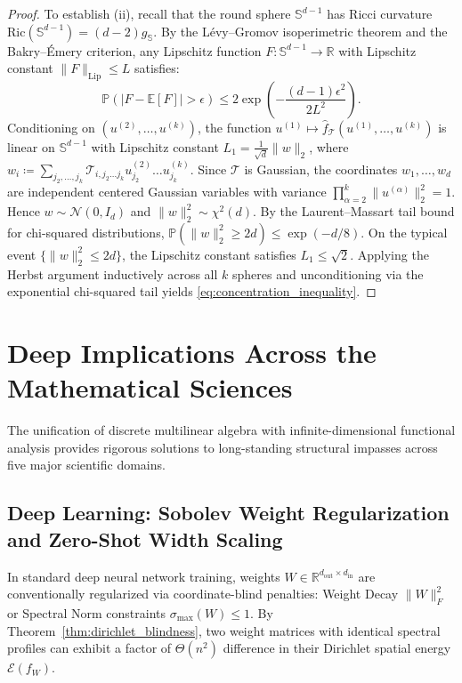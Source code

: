 \documentclass[11pt,a4paper,reqno]{amsart}
\theoremstyle{definition}
\numberwithin{equation}{section}
\providecommand{\R}{\mathbb{R}}
\providecommand{\Sph}{\mathbb{S}}
\newcommand{\Lip}{\operatorname{Lip}}
\providecommand{\Sph}{\mathbb{S}}
\providecommand{\R}{\mathbb{R}}
\begin{document}
\begin{proof}
To establish (ii), recall that the round sphere $\Sph^{d-1}$ has Ricci curvature $\mathrm{Ric}(\Sph^{d-1}) = (d-2) g_{\Sph}$. By the L\'evy--Gromov isoperimetric theorem and the Bakry--\'Emery criterion, any Lipschitz function $F \colon \Sph^{d-1} \to \R$ with Lipschitz constant $\|F\|_{\Lip} \le L$ satisfies:
\begin{equation}
    \mathbb{P}\left( |F - \mathbb{E}[F]| > \epsilon \right) \le 2 \exp\left( - \frac{(d-1)\epsilon^2}{2 L^2} \right).
\end{equation}
Conditioning on $(u^{(2)}, \dots, u^{(k)})$, the function $u^{(1)} \mapsto \widehat{f}_{\mathcal{T}}(u^{(1)}, \dots, u^{(k)})$ is linear on $\Sph^{d-1}$ with Lipschitz constant $L_1 = \frac{1}{\sqrt{d}} \|w\|_2$, where $w_i \coloneqq \sum_{j_2, \dots, j_k} \mathcal{T}_{i, j_2 \dots j_k} u_{j_2}^{(2)} \dots u_{j_k}^{(k)}$. Since $\mathcal{T}$ is Gaussian, the coordinates $w_1, \dots, w_d$ are independent centered Gaussian variables with variance $\prod_{\alpha=2}^k \|u^{(\alpha)}\|_2^2 = 1$. Hence $w \sim \mathcal{N}(0, I_d)$ and $\|w\|_2^2 \sim \chi^2(d)$. By the Laurent--Massart tail bound for chi-squared distributions, $\mathbb{P}(\|w\|_2^2 \ge 2d) \le \exp(-d/8)$. On the typical event $\{\|w\|_2^2 \le 2d\}$, the Lipschitz constant satisfies $L_1 \le \sqrt{2}$. Applying the Herbst argument inductively across all $k$ spheres and unconditioning via the exponential chi-squared tail yields \eqref{eq:concentration_inequality}.
\end{proof}

\section{Deep Implications Across the Mathematical Sciences}
\label{sec:implications}

The unification of discrete multilinear algebra with infinite-dimensional functional analysis provides rigorous solutions to long-standing structural impasses across five major scientific domains.

\subsection{Deep Learning: Sobolev Weight Regularization and Zero-Shot Width Scaling}
\label{subsec:imp_dl}
In standard deep neural network training, weights $W \in \R^{d_{\mathrm{out}} \times d_{\mathrm{in}}}$ are conventionally regularized via coordinate-blind penalties: Weight Decay $\|W\|_F^2$ or Spectral Norm constraints $\sigma_{\max}(W) \le 1$. By Theorem~\ref{thm:dirichlet_blindness}, two weight matrices with identical spectral profiles can exhibit a factor of $\Theta(n^2)$ difference in their Dirichlet spatial energy $\mathcal{E}(f_W)$. 
\end{document}
